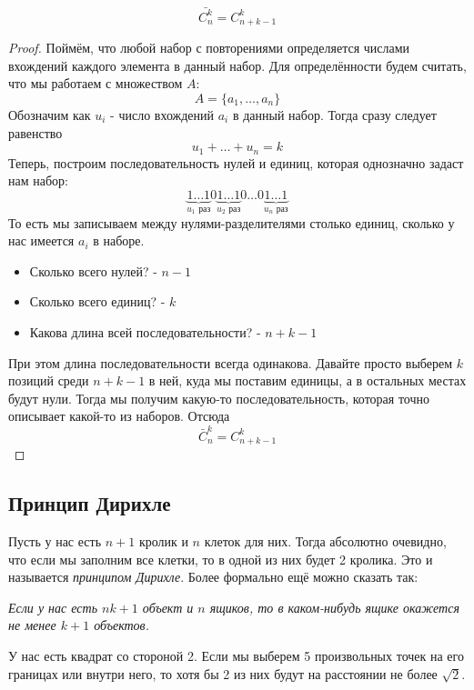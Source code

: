 \begin{theorem}
	\[
		\bar{C_n^k} = C_{n + k - 1}^k
	\]
\end{theorem}

\begin{proof}
	Поймём, что любой набор с повторениями определяется числами вхождений каждого элемента в данный набор. Для определённости будем считать, что мы работаем с множеством $A$:
	\[
		A = \{a_1, \dots, a_n\}
	\]
	Обозначим как $u_i$ - число вхождений $a_i$ в данный набор. Тогда сразу следует равенство
	\[
		u_1 + \ldots + u_n = k
	\]
	Теперь, построим последовательность нулей и единиц, которая однозначно задаст нам набор:
	\[
		\underbrace{1 \dots 1}_{u_1 \text{ раз}}
		0
		\underbrace{1 \dots 1}_{u_2 \text{ раз}}
		0 \dots 0
		\underbrace{1 \dots 1}_{u_n \text{ раз}}
	\]
	То есть мы записываем между нулями-разделителями столько единиц, сколько у нас имеется $a_i$ в наборе.
	\begin{itemize}
		\item Сколько всего нулей? - $n - 1$
		\item Сколько всего единиц? - $k$
		\item Какова длина всей последовательности? - $n + k - 1$
	\end{itemize}
	При этом длина последовательности всегда одинакова. Давайте просто выберем $k$ позиций среди $n + k - 1$ в ней, куда мы поставим единицы, а в остальных местах будут нули. Тогда мы получим какую-то последовательность, которая точно описывает какой-то из наборов. Отсюда
	\[
		\bar{C}_n^k = C_{n + k - 1}^k
	\]
\end{proof}

\subsection{Принцип Дирихле}

\begin{definition}
	Пусть у нас есть $n + 1$ кролик и $n$ клеток для них. Тогда абсолютно очевидно, что если мы заполним все клетки, то в одной из них будет 2 кролика. Это и называется \textit{принципом Дирихле}. Более формально ещё можно сказать так:
	
	\textit{
	Если у нас есть $nk + 1$ объект и $n$ ящиков, то в каком-нибудь ящике окажется не менее $k + 1$ объектов.
	}
\end{definition}

\begin{example}
	У нас есть квадрат со стороной 2. Если мы выберем 5 произвольных точек на его границах или внутри него, то хотя бы 2 из них будут на расстоянии не более $\sqrt{2}$.
\end{example}

